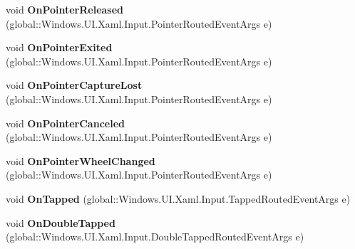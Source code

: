 \begin{DoxyCompactItemize}
void {\bfseries On\+Pointer\+Released} (global\+::\+Windows.\+U\+I.\+Xaml.\+Input.\+Pointer\+Routed\+Event\+Args e)
\item 
\mbox{\label{interface_windows_1_1_u_i_1_1_xaml_1_1_controls_1_1_i_control_overrides_aec342f687e1c436a3c9ea647acf70cf1}} 
void {\bfseries On\+Pointer\+Exited} (global\+::\+Windows.\+U\+I.\+Xaml.\+Input.\+Pointer\+Routed\+Event\+Args e)
\item 
\mbox{\label{interface_windows_1_1_u_i_1_1_xaml_1_1_controls_1_1_i_control_overrides_a6821de9a94eb91eef66fd171fcdd33ea}} 
void {\bfseries On\+Pointer\+Capture\+Lost} (global\+::\+Windows.\+U\+I.\+Xaml.\+Input.\+Pointer\+Routed\+Event\+Args e)
\item 
\mbox{\label{interface_windows_1_1_u_i_1_1_xaml_1_1_controls_1_1_i_control_overrides_af3cfd6f136b89bd611f4f199a47e9103}} 
void {\bfseries On\+Pointer\+Canceled} (global\+::\+Windows.\+U\+I.\+Xaml.\+Input.\+Pointer\+Routed\+Event\+Args e)
\item 
\mbox{\label{interface_windows_1_1_u_i_1_1_xaml_1_1_controls_1_1_i_control_overrides_a718444e3da7d52bbefe627be97c6acb1}} 
void {\bfseries On\+Pointer\+Wheel\+Changed} (global\+::\+Windows.\+U\+I.\+Xaml.\+Input.\+Pointer\+Routed\+Event\+Args e)
\item 
\mbox{\label{interface_windows_1_1_u_i_1_1_xaml_1_1_controls_1_1_i_control_overrides_a03ba05ffb887e2d5b8a4e46f27ed4817}} 
void {\bfseries On\+Tapped} (global\+::\+Windows.\+U\+I.\+Xaml.\+Input.\+Tapped\+Routed\+Event\+Args e)
\item 
\mbox{\label{interface_windows_1_1_u_i_1_1_xaml_1_1_controls_1_1_i_control_overrides_a5a5f4e8f42a2fe161802c62c49b6876c}} 
void {\bfseries On\+Double\+Tapped} (global\+::\+Windows.\+U\+I.\+Xaml.\+Input.\+Double\+Tapped\+Routed\+Event\+Args e)
\item 
\mbox{\label{interface_windows_1_1_u_i_1_1_xaml_1_1_controls_1_1_i_control_overrides_a92652b416b1ff3a471b4cf7226c1f60f}} 

\end{DoxyCompactItemize}
